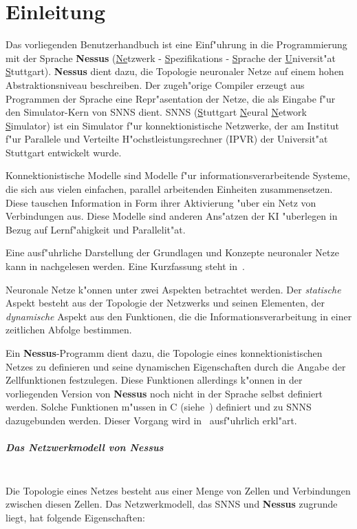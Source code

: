 \chapter{Einleitung}

Das vorliegenden Benutzerhandbuch ist eine Einf"uhrung in die
Programmierung mit der Sprache {\bf Nessus} ({\underline {Ne}}tzwerk -
{\underline S}pezifikations - {\underline S}prache der {\underline
U}niversit"at {\underline S}tuttgart). {\bf Nessus} dient dazu, die
Topologie neuronaler Netze auf einem hohen Abstraktionsniveau
beschreiben. Der zugeh"orige Compiler erzeugt aus Programmen der
Sprache eine Repr"asentation der Netze, die als Eingabe f"ur den
Simulator-Kern von SNNS dient. SNNS (\underline{S}tuttgart
\underline{N}eural \underline{N}etwork \underline{S}imulator) ist ein
Simulator f"ur konnektionistische Netzwerke, der am Institut f"ur
Parallele und Verteilte H"ochstleistungsrechner (IPVR) der
Universit"at Stuttgart entwickelt wurde.

Konnektionistische Modelle sind Modelle f"ur informationsverarbeitende
Systeme, die sich aus vielen einfachen, parallel arbeitenden Einheiten
zusammensetzen. Diese tauschen Information in Form ihrer
Aktivierung "uber ein Netz von Verbindungen aus.
Diese Modelle sind anderen Ans"atzen der KI "uberlegen in Bezug auf
Lernf"ahigkeit und Parallelit"at.

Eine ausf"uhrliche Darstellung der Grundlagen und Konzepte neuronaler
Netze kann in \cite{rum861} nachgelesen werden.  Eine Kurzfassung
steht in~\cite{kem88}.

Neuronale Netze k"onnen unter zwei Aspekten betrachtet werden. Der
{\em statische}\/ Aspekt besteht aus der Topologie der Netzwerks und
seinen Elementen, der {\em dynamische}\/ Aspekt aus den Funktionen,
die die Informationsverarbeitung in einer zeitlichen Abfolge
bestimmen.

Ein {\bf Nessus}-Programm dient dazu, die Topologie eines
konnektionistischen Netzes zu definieren und seine dynamischen
Eigenschaften durch die Angabe der Zellfunktionen festzulegen. Diese
Funktionen allerdings k"onnen in der vorliegenden Version von {\bf
Nessus} noch nicht in der Sprache selbst definiert werden.  Solche
Funktionen m"ussen in C (siehe~\cite{ker781}) definiert und zu SNNS
dazugebunden werden. Dieser Vorgang wird in~\cite{SNNSDoku}
ausf"uhrlich erkl"art.

\paragraph{Das Netzwerkmodell von {\bf Nessus}} ~~\\ Die
Topologie eines Netzes besteht aus einer Menge von
Zellen und Verbindungen zwischen diesen Zellen. Das
Netzwerkmodell, das SNNS und {\bf
Nessus} zugrunde liegt, hat folgende Eigenschaften:

